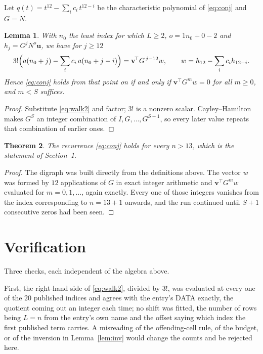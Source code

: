 \documentclass[11pt,a4paper]{article}
\theoremstyle{plain}
\newtheorem{theorem}{Theorem}
\newtheorem{lemma}[theorem]{Lemma}
\theoremstyle{definition}
\begin{document}
Let $q(t)=t^{12}-\sum_i c_i\,t^{12-i}$ be the characteristic polynomial of
\eqref{eq:conj} and $G=N$.

\begin{lemma}\label{lem:crit}
With $n_0$ the least index for which $L\ge2$, $o=1n_0+0-2$ and
$h_j=G^{j}N^{o}\mathbf{u}$, we have for $j\ge12$
\[
3!\Bigl(a(n_0+j)-\sum_i c_i\,a(n_0+j-i)\Bigr)=\mathbf{v}^{\!\top}G^{\,j-12}w,
\qquad w=h_{12}-\sum_i c_i h_{12-i} .
\]
Hence \eqref{eq:conj} holds from that point on if and only if
$\mathbf{v}^{\!\top}G^{m}w=0$ for all $m\ge0$, and $m<S$ suffices.
\end{lemma}

\begin{proof}
Substitute \eqref{eq:walk2} and factor; $3!$ is a nonzero scalar. Cayley--Hamilton
makes $G^{S}$ an integer combination of $I,G,\dots,G^{S-1}$, so every later value repeats
that combination of earlier ones.
\end{proof}

\begin{theorem}
The recurrence \eqref{eq:conj} holds for every $n>13$, which is the statement of
Section~1.
\end{theorem}

\begin{proof}
The digraph was built directly from the definitions above. The vector $w$ was formed by
$12$ applications of $G$ in exact integer arithmetic and $\mathbf{v}^{\!\top}G^{m}w$
evaluated for $m=0,1,\dots$, again exactly. Every one of those integers vanishes from the
index corresponding to $n=13+1$ onwards, and the run continued until $S+1$ consecutive
zeros had been seen.
\end{proof}

\section{Verification}

Three checks, each independent of the algebra above.

First, the right-hand side of \eqref{eq:walk2}, divided by $3!$, was evaluated at every
one of the $20$ published indices and agrees with the entry's DATA exactly, the quotient
coming out an integer each time; no shift was fitted, the number of rows being
$L=n$ from the entry's own name and the offset saying which index the first published
term carries. A misreading of the offending-cell rule, of the budget, or of the inversion in
Lemma~\ref{lem:inv} would change the counts and be rejected here.
\end{document}
